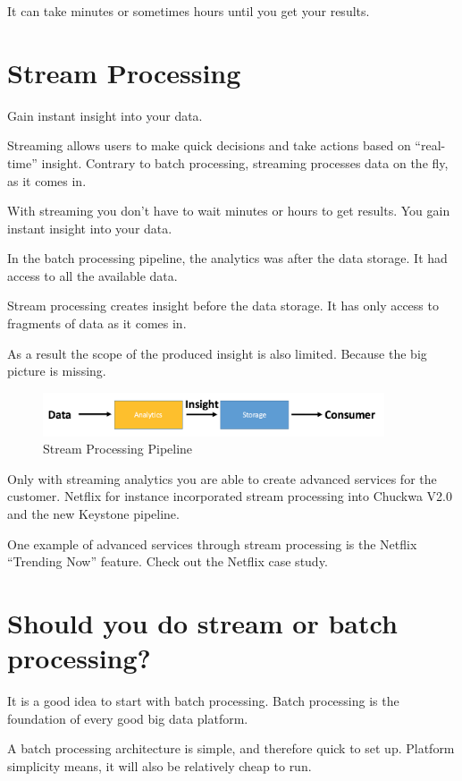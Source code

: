 \documentclass[12pt, numbers=noenddot]{scrreprt} %
\begin{document}
It can take minutes or sometimes hours until you get your results.



\section{Stream Processing} Gain instant insight into your data.

Streaming allows users to make quick decisions and take actions based on “real-time” insight. Contrary to batch processing, streaming processes data on the fly, as it comes in.

With streaming you don’t have to wait minutes or hours to get results. You gain instant insight into your data.

In the batch processing pipeline, the analytics was after the data storage. It had access to all the available data.

Stream processing creates insight before the data storage. It has only access to fragments of data as it comes in.

As a result the scope of the produced insight is also limited. Because the big picture is missing.

\begin{figure}[htbp]
  \centering
     \includegraphics[width=0.9\textwidth]{images/Simple-Stream-Processing-Workflow}
  \caption{Stream Processing Pipeline}
  \label{fig:Bild1}
\end{figure}

Only with streaming analytics you are able to create advanced services for the customer. Netflix for instance incorporated stream processing into Chuckwa V2.0 and the new Keystone pipeline.

One example of advanced services through stream processing is the Netflix “Trending Now” feature.
Check out the Netflix case study.

\section{Should you do stream or batch processing?}

It is a good idea to start with batch processing. Batch processing is the foundation of every good big data platform.

A batch processing architecture is simple, and therefore quick to set up. Platform simplicity means, it will also be relatively cheap to run.
\end{document}
